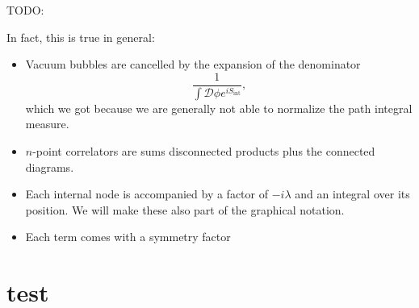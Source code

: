 \documentclass[12pt]{article}
\begin{document}
TODO:

In fact, this is true in general:
\begin{itemize}
\item Vacuum bubbles are cancelled by the expansion of the denominator 
  \begin{equation}
    \frac{1}{\int \mathcal{D}\phi e^{iS_\text{int}}},
  \end{equation}
  which we got because we are generally not able to normalize the path
  integral measure.
\item $n$-point correlators are sums disconnected products plus the
  connected diagrams.
\item Each internal node is accompanied by a factor of $-i\lambda$ and
  an integral over its position. We will make these also part of the
  graphical notation.
\item Each term comes with a symmetry factor
\end{itemize}


\newpage
\appendix

\section{test}



 
\renewcommand{\refname}{Bibliography}

\end{document}
